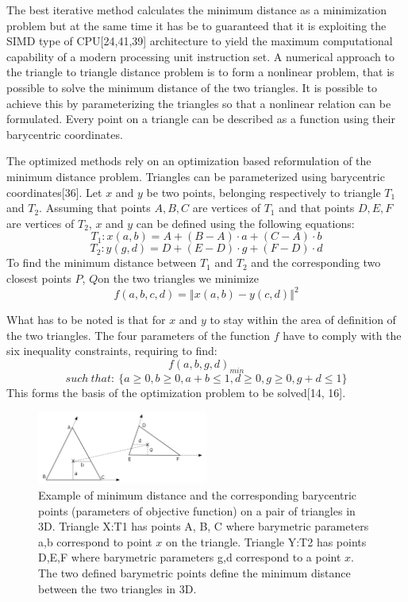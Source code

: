 \documentclass[times,12pt]{ACME2015article}
\begin{document}
The best iterative method calculates the minimum distance as a minimization problem but at the same time it has be to guaranteed that it is exploiting the SIMD type of CPU[24,41,39] architecture to yield the maximum computational capability of a modern processing unit instruction set. A numerical approach to the triangle to triangle distance problem is to form a nonlinear problem, that is possible to solve the minimum distance of the two triangles. It is possible to achieve this by parameterizing the triangles so that a nonlinear relation can be formulated. Every point on a triangle can be described as a function using their barycentric coordinates.

The optimized methods rely on an optimization based reformulation of the minimum distance problem. Triangles can be parameterized using barycentric coordinates[36]. Let $x$ and $y$ be two points, belonging respectively to triangle $T_1$ and $T_2$. Assuming that points $A, B, C$ are vertices of $T_1$ and that points $D, E, F$ are vertices of $T_2$, $x$ and $y$ can be defined using the following equations: 
\begin{equation}
T_{1}:x(a,b)=A+(B-A) \cdot a+(C-A)\cdot b
\end{equation}
\begin{equation}
T_{2}:y(g,d)=D+(E-D) \cdot g+(F-D) \cdot d
\end{equation} 
To find the minimum distance between $T_1$ and $T_2$ and the corresponding two closest points $P$, $Q$on the two triangles we minimize
\begin{equation}
f\left(a,b,c,d\right)=\left\Vert x\left(a,b\right)-y\left(c,d\right)\right\Vert ^{2}
\end{equation} 

What has to be noted is that for $x$ and $y$ to stay within the area of definition of the two triangles. The four parameters of the function $f$ have to comply with the six inequality constraints, requiring to find:
\begin{equation}
f(a,b,g,d)_{min}
\end{equation}  
$$such \:that: \: \{a\geq0,b\geq0, a+b\leq1, d\geq0, g\geq0, g+d\leq1 \}$$ 
This forms the basis of the optimization problem to be solved[14, 16].

\begin{figure}[!h]
\centering
\includegraphics[width=0.5\textwidth]{c} \protect\caption{\label{fig11}Example of minimum distance and the corresponding barycentric points (parameters of objective function) on a pair of triangles in 3D. Triangle X:T1 has points A, B, C where barymetric parameters a,b correspond to point $x$ on the triangle. Triangle Y:T2 has points D,E,F where barymetric parameters g,d correspond to a point $x$. The two defined barymetric points define the minimum distance between the two triangles in 3D.}
\end{figure} 
\end{document}
